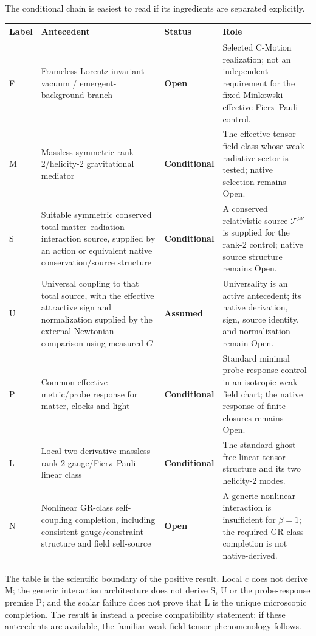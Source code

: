 \documentclass[11pt]{article}
\newcommand{\statusConditional}{\textcolor{yellow!60!black}{\textbf{Conditional}}}
\newcommand{\statusAssumed}{\textcolor{orange!80!black}{\textbf{Assumed}}}
\newcommand{\statusOpen}{\textcolor{red!75!black}{\textbf{Open}}}
\theoremstyle{plain}
\theoremstyle{remark}
\begin{document}
The conditional chain is easiest to read if its ingredients are separated explicitly.
\begin{longtable}{@{}P{1.2cm}P{4.3cm}P{3.0cm}P{5.0cm}@{}}
\toprule
\textbf{Label} & \textbf{Antecedent} & \textbf{Status} & \textbf{Role} \\
\midrule
\endhead
F & Frameless Lorentz-invariant vacuum / emergent-background branch & \statusOpen{} & Selected C-Motion realization; not an independent requirement for the fixed-Minkowski effective Fierz--Pauli control. \\
M & Massless symmetric rank-2/helicity-2 gravitational mediator & \statusConditional{} & The effective tensor field class whose weak radiative sector is tested; native selection remains Open. \\
S & Suitable symmetric conserved total matter--radiation--interaction source, supplied by an action or equivalent native conservation/source structure & \statusConditional{} & A conserved relativistic source $\mathcal T^{\mu\nu}$ is supplied for the rank-2 control; native source structure remains Open. \\
U & Universal coupling to that total source, with the effective attractive sign and normalization supplied by the external Newtonian comparison using measured $G$ & \statusAssumed{} & Universality is an active antecedent; its native derivation, sign, source identity, and normalization remain Open. \\
P & Common effective metric/probe response for matter, clocks and light & \statusConditional{} & Standard minimal probe-response control in an isotropic weak-field chart; the native response of finite closures remains Open. \\
L & Local two-derivative massless rank-2 gauge/Fierz--Pauli linear class & \statusConditional{} & The standard ghost-free linear tensor structure and its two helicity-2 modes. \\
N & Nonlinear GR-class self-coupling completion, including consistent gauge/constraint structure and field self-source & \statusOpen{} & A generic nonlinear interaction is insufficient for $\beta=1$; the required GR-class completion is not native-derived. \\
\bottomrule
\end{longtable}

The table is the scientific boundary of the positive result.  Local $c$ does not derive M;
the generic interaction architecture does not derive S, U or the probe-response
premise P; and the scalar failure does not prove that L is the unique microscopic
completion.  The result is instead a precise
compatibility statement: if these antecedents are available, the familiar weak-field
tensor phenomenology follows.
\end{document}

